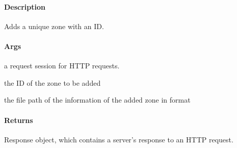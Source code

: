 \documentclass[letterpaper,10pt,english]{sphinxmanual}
\begin{document}

\begin{fulllineitems}
\label{\detokenize{gemini_event_zone_API:gemini_event_zone_API.add_zone_id}}
\pysigstartsignatures
{}
\pysigstopsignatures

\paragraph{Description}
\label{\detokenize{gemini_event_zone_API:id2}}
\sphinxAtStartPar
Adds a unique zone with an ID.


\paragraph{Args}
\label{\detokenize{gemini_event_zone_API:id3}}\begin{description}
\sphinxAtStartPar
a request session for HTTP requests.

\sphinxAtStartPar
the ID of the zone to be added

\sphinxAtStartPar
the file path of the information of the added zone in  format

\end{description}


\paragraph{Returns}
\label{\detokenize{gemini_event_zone_API:id4}}\begin{description}
\sphinxAtStartPar
Response object, which contains a server’s response to an HTTP request.

\end{description}

\end{fulllineitems}

\end{document}
